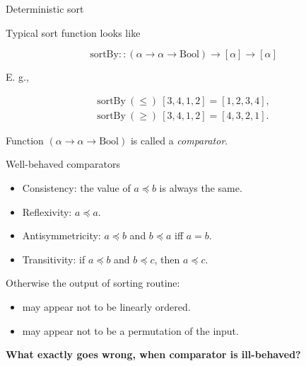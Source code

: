 \documentclass[handout]{beamer}
\def\ge{\geqslant}
\def\le{\leqslant}
\begin{document}
\begin{frame}{Deterministic sort}

Typical sort function looks like

\begin{equation*}
\text{sortBy} :: (\alpha \to \alpha \to \text{Bool})
\to [\alpha]
\to [\alpha]
\end{equation*}

E. g.,

\vspace{-4ex}

\begin{align*}
\text{sortBy} ~ (\le) ~ [3,4,1,2] = [1,2,3,4], \\
\text{sortBy} ~ (\ge) ~ [3,4,1,2] = [4,3,2,1].
\end{align*}

Function $(\alpha \to \alpha \to \text{Bool})$ is called a {\em comparator}.

\end{frame}

\begin{frame}{Well-behaved comparators}
\begin{itemize}

\item Consistency: the value of $ a \preceq b $ is always the same.

\item Reflexivity: $a \preceq a$.

\item Antisymmetricity: $a \preceq b$ and $b \preceq a$ iff $a = b$.

\item Transitivity: if $a \preceq b$ and $b \preceq c$, then $a \preceq c$.
\end{itemize}

\bigskip

Otherwise the output of sorting routine:

\begin{itemize}

\item may appear not to be linearly ordered.

\item may appear not to be a permutation of the input.

\end{itemize}

\bigskip

\centerline{\bf What exactly goes wrong, when comparator is ill-behaved?}

\end{frame}
\end{document}
